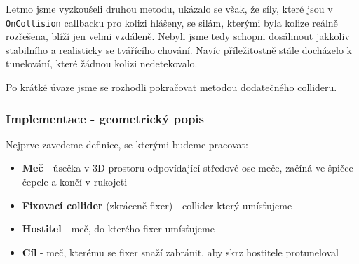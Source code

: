 Letmo jsme vyzkoušeli druhou metodu, ukázalo se však, že síly, které jsou v \texttt{OnCollision} callbacku pro kolizi hlášeny, se silám, kterými byla kolize reálně rozřešena, blíží jen velmi vzdáleně. Nebyli jsme tedy schopni dosáhnout jakkoliv stabilního a realisticky se tvářícího chování. Navíc příležitostně stále docházelo k tunelování, které žádnou kolizi nedetekovalo.

\bigbreak

Po krátké úvaze jsme se rozhodli pokračovat metodou dodatečného collideru.



\subsubsection*{Implementace - geometrický popis}

Nejprve zavedeme definice, se kterými budeme pracovat:
\begin{itemize}
  \item \textbf{Meč} - úsečka v 3D prostoru odpovídající středové ose meče, začíná ve špičce čepele a končí v rukojeti
  \item \textbf{Fixovací collider} (zkráceně fixer) - collider který umísťujeme 
  \item \textbf{Hostitel} - meč, do kterého fixer umísťujeme
  \item \textbf{Cíl} - meč, kterému se fixer snaží zabránit, aby skrz hostitele protuneloval
\end{itemize}

